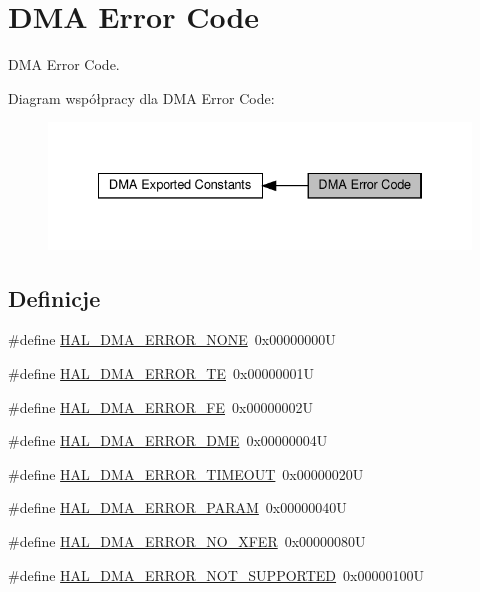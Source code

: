 \hypertarget{group___d_m_a___error___code}{}\section{D\+MA Error Code}
\label{group___d_m_a___error___code}


D\+MA Error Code.  


Diagram współpracy dla D\+MA Error Code\+:\nopagebreak
\begin{figure}[H]
\begin{center}
\leavevmode
\includegraphics[width=334pt]{group___d_m_a___error___code}
\end{center}
\end{figure}
\subsection*{Definicje}
\begin{DoxyCompactItemize}
\item 
\#define \hyperlink{group___d_m_a___error___code_gaad4009390bfbe05a1bb7115d03c25a97}{H\+A\+L\+\_\+\+D\+M\+A\+\_\+\+E\+R\+R\+O\+R\+\_\+\+N\+O\+NE}~0x00000000U
\item 
\#define \hyperlink{group___d_m_a___error___code_ga9882442c5f8f0170917934bbee1cc92d}{H\+A\+L\+\_\+\+D\+M\+A\+\_\+\+E\+R\+R\+O\+R\+\_\+\+TE}~0x00000001U
\item 
\#define \hyperlink{group___d_m_a___error___code_ga019411712b9aee1d34b57d029a461fa4}{H\+A\+L\+\_\+\+D\+M\+A\+\_\+\+E\+R\+R\+O\+R\+\_\+\+FE}~0x00000002U
\item 
\#define \hyperlink{group___d_m_a___error___code_gabac48184446aea8f467483382fc6689b}{H\+A\+L\+\_\+\+D\+M\+A\+\_\+\+E\+R\+R\+O\+R\+\_\+\+D\+ME}~0x00000004U
\item 
\#define \hyperlink{group___d_m_a___error___code_ga6cf6a5b8881ff36ed4316a29bbfb5b79}{H\+A\+L\+\_\+\+D\+M\+A\+\_\+\+E\+R\+R\+O\+R\+\_\+\+T\+I\+M\+E\+O\+UT}~0x00000020U
\item 
\#define \hyperlink{group___d_m_a___error___code_ga5aaaad3b88a77147d1e3daa3a3ad9e60}{H\+A\+L\+\_\+\+D\+M\+A\+\_\+\+E\+R\+R\+O\+R\+\_\+\+P\+A\+R\+AM}~0x00000040U
\item 
\#define \hyperlink{group___d_m_a___error___code_gab7526e686427f26bf3b6af062d5a690b}{H\+A\+L\+\_\+\+D\+M\+A\+\_\+\+E\+R\+R\+O\+R\+\_\+\+N\+O\+\_\+\+X\+F\+ER}~0x00000080U
\item 
\#define \hyperlink{group___d_m_a___error___code_ga7432f31f9972e1c0a398a3f20587d118}{H\+A\+L\+\_\+\+D\+M\+A\+\_\+\+E\+R\+R\+O\+R\+\_\+\+N\+O\+T\+\_\+\+S\+U\+P\+P\+O\+R\+T\+ED}~0x00000100U
\end{DoxyCompactItemize}


